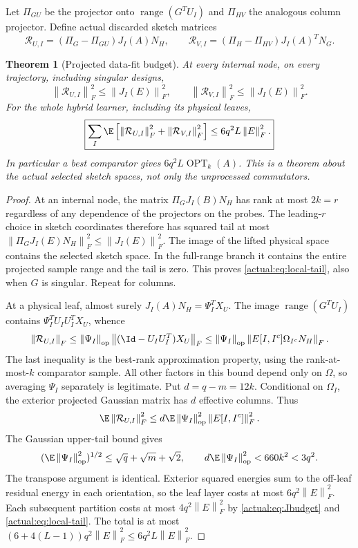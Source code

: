 \documentclass[11pt,oneside,openany,a4paper]{book}
\numberwithin{equation}{chapter}
\newtheorem{theorem}{Theorem}[chapter]
\theoremstyle{definition}
\theoremstyle{remark}
\newcommand{\F}[1]{\left\lVert#1\right\rVert_F}
\newcommand{\op}[1]{\left\lVert#1\right\rVert_{\rm op}}
\DeclareMathOperator{\ran}{range}\DeclareMathOperator{\OPT}{OPT}
\begin{document}
Let $\Pi_{GU}$ be the projector onto $\ran(G^TU_I)$ and $\Pi_{HV}$ the analogous column projector. Define actual discarded sketch matrices
\begin{equation}\label{actual:eq:residuals}
 \mathcal R_{U,I}=(\Pi_G-\Pi_{GU})J_I(A)N_H,
 \qquad
 \mathcal R_{V,I}=(\Pi_H-\Pi_{HV})J_I(A)^TN_G.
\end{equation}
\begin{theorem}[Projected data-fit budget]\label{actual:thm:datafit}
At every internal node, on every trajectory, including singular designs,
\begin{equation}\label{actual:eq:local-tail}
 \F{\mathcal R_{U,I}}^2\le\F{J_I(E)}^2,
 \qquad
 \F{\mathcal R_{V,I}}^2\le\F{J_I(E)}^2.
\end{equation}
For the whole hybrid learner, including its physical leaves,
\begin{equation}\label{actual:eq:global-tail}
 \boxed{\sum_I\E\left[\F{\mathcal R_{U,I}}^2+
                            \F{\mathcal R_{V,I}}^2\right]
           \le6q^2L\F E^2.}
\end{equation}
In particular a best comparator gives $6q^2L\OPT_k(A)$. This is a theorem about the actual selected sketch spaces, not only the unprocessed commutators.
\end{theorem}
\begin{proof}
At an internal node, the matrix $\Pi_GJ_I(B)N_H$ has rank at most $2k=r$ regardless of any dependence of the projectors on the probes. The leading-$r$ choice in sketch coordinates therefore has squared tail at most
$\F{\Pi_GJ_I(E)N_H}^2\le\F{J_I(E)}^2$.
The image of the lifted physical space contains the selected sketch space. In the full-range branch it contains the entire projected sample range and the tail is zero. This proves \eqref{actual:eq:local-tail}, also when $G$ is singular. Repeat for columns.

At a physical leaf, almost surely
$J_I(A)N_H=\Psi_I^TX_U$. The image $\ran(G^TU_I)$ contains $\Psi_I^TU_IU_I^TX_U$, whence
\[
 \F{\mathcal R_{U,I}}
 \le\op{\Psi_I}\F{(\Id-U_IU_I^T)X_U}
 \le\op{\Psi_I}\F{E[I,I^c]\Omega_{I^c}N_H}.
\]
The last inequality is the best-rank approximation property, using the rank-at-most-$k$ comparator sample. All other factors in this bound depend only on $\Omega$, so averaging $\Psi_I$ separately is legitimate. Put $d=q-m=12k$. Conditional on $\Omega_I$, the exterior projected Gaussian matrix has $d$ effective columns. Thus
\[
 \E\F{\mathcal R_{U,I}}^2
 \le d\E\op{\Psi_I}^2\F{E[I,I^c]}^2.
\]
The Gaussian upper-tail bound gives
\[
 (\E\op{\Psi_I}^2)^{1/2}\le\sqrt q+\sqrt m+\sqrt2,
 \qquad d\E\op{\Psi_I}^2<660k^2<3q^2.
\]
The transpose argument is identical. Exterior squared energies sum to the off-leaf residual energy in each orientation, so the leaf layer costs at most $6q^2\F E^2$. Each subsequent partition costs at most $4q^2\F E^2$ by \eqref{actual:eq:Jbudget} and \eqref{actual:eq:local-tail}. The total is at most
$(6+4(L-1))q^2\F E^2\le6q^2L\F E^2$.
\end{proof}
\end{document}
